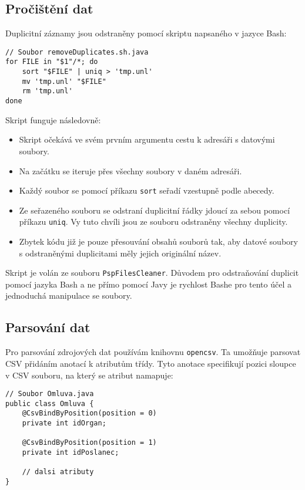 \subsection*{Pročištění dat}
Duplicitní záznamy jsou odstraněny pomocí skriptu napsaného v jazyce Bash:

\begin{lstlisting}[caption={Skript pro odstranění duplicitních řádků}, tabsize=2]
// Soubor removeDuplicates.sh.java
for FILE in "$1"/*; do
	sort "$FILE" | uniq > 'tmp.unl'
	mv 'tmp.unl' "$FILE"
	rm 'tmp.unl'
done
\end{lstlisting}

\noindent Skript funguje následovně:

\begin{itemize}
	\item Skript očekává ve svém prvním argumentu cestu k adresáři s datovými soubory.
	
	\item Na začátku se iteruje přes všechny soubory v daném adresáři.
	
	\item Každý soubor se pomocí příkazu \lstinline|sort| seřadí vzestupně podle abecedy.
	
	\item Ze seřazeného souboru se odstraní duplicitní řádky jdoucí za sebou pomocí příkazu \lstinline|uniq|. Vy tuto chvíli jsou ze souboru odstraněny všechny duplicity.
	
	\item Zbytek kódu již je pouze přesouvání obsahů souborů tak, aby datové soubory s odstraněnými duplicitami měly jejich originální název.
\end{itemize}

\noindent Skript je volán ze souboru \lstinline|PspFilesCleaner|. Důvodem pro odstraňování duplicit pomocí jazyka Bash a ne přímo pomocí Javy je rychlost Bashe pro tento účel a jednoduchá manipulace se soubory.

\subsection*{Parsování dat}
Pro parsování zdrojových dat používám knihovnu \lstinline|opencsv|. Ta umožňuje parsovat CSV přidáním anotací k atributům třídy. Tyto anotace specifikují pozici sloupce v CSV souboru, na který se atribut namapuje:

\begin{lstlisting}[caption={Parsování datového souboru omluvy.unl}, tabsize=2]
// Soubor Omluva.java
public class Omluva {
	@CsvBindByPosition(position = 0)
	private int idOrgan;
	
	@CsvBindByPosition(position = 1)
	private int idPoslanec;

	// dalsi atributy	
}
\end{lstlisting}

